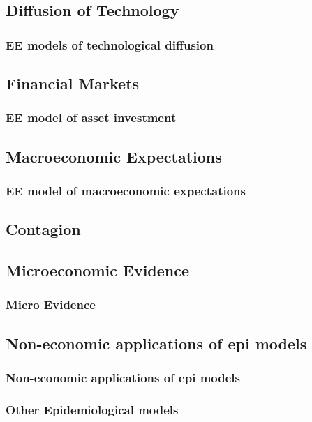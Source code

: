 \documentclass[pdflatex]{beamer}
\begin{document}
\subsection{Diffusion of Technology}\label{subsubsec:techDiffusion}

\begin{frame}
	\frametitle{EE models of technological diffusion}

\end{frame}


\subsection{Financial Markets}\label{subsec:assetprice}

\begin{frame}
	\frametitle{EE model of asset investment}

\end{frame}

\subsection{Macroeconomic Expectations}\label{subsec:macroExp}

\begin{frame}
	\frametitle{EE model of macroeconomic expectations}

\end{frame}

\subsection{Contagion}\label{subsec:Contagion}

\subsection{Microeconomic Evidence}\label{subsec:microEvidence}


\begin{frame}
	\frametitle{Micro Evidence}
\end{frame}

\subsection{Non-economic applications of epi models}
\begin{frame}
	\frametitle{Non-economic applications of epi models}
\end{frame}
\begin{frame}
	\frametitle{Other Epidemiological models}

\end{frame}
\end{document}

